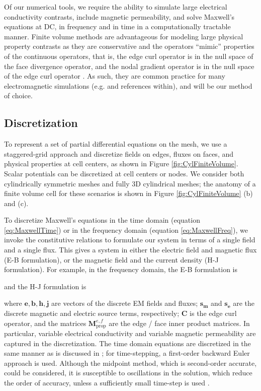 \documentclass[preprint,review,3p,times,onecolumn,authoryear]{elsarticle}
\begin{document}
Of our numerical tools, we require the ability to simulate large electrical conductivity contrasts, include magnetic permeability, and solve Maxwell's equations at DC, in frequency and in time in a computationally tractable manner. Finite volume methods are advantageous for modeling large physical property contrasts as they are conservative and the operators ``mimic'' properties of the continuous operators, that is, the edge curl operator is in the null space of the face divergence operator, and the nodal gradient operator is in the null space of the edge curl operator \citep{Hyman1999}. As such, they are common practice for many electromagnetic simulations (e.g. \cite{Horesh2011, Haber2014, Jahandari2014} and references within), and will be our method of choice.


\subsection{Discretization}

To represent a set of partial differential equations on the mesh, we use a staggered-grid approach \citep{Yee1966} and discretize fields on edges, fluxes on faces, and physical properties at cell centers, as shown in Figure \ref{fig:CylFiniteVolume}. Scalar potentials can be discretized at cell centers or nodes. We consider both cylindrically symmetric meshes and fully 3D cylindrical meshes; the anatomy of a finite volume cell for these scenarios is shown in Figure \ref{fig:CylFiniteVolume} (b) and (c).




To discretize Maxwell's equations in the time domain (equation \ref{eq:MaxwellTime}) or in the frequency domain (equation \ref{eq:MaxwellFreq}), we invoke the constitutive relations to formulate our system in terms of a single field and a single flux. This gives a system in either the electric field and magnetic flux (E-B formulation), or the magnetic field and the current density (H-J formulation). For example, in the frequency domain, the E-B formulation is

and the H-J formulation is

where $\mathbf{e}, \mathbf{b}, \mathbf{h}, \mathbf{j}$ are vectors of the discrete EM fields and fluxes; $\mathbf{s_m}$ and $\mathbf{s_e}$ are the discrete magnetic and electric source terms, respectively; $\mathbf{C}$ is the edge curl operator, and the matrices $\mathbf{M}_{\text{prop}}^{e,f}$ are the edge / face inner product matrices. In particular, variable electrical conductivity and variable magnetic permeability are captured in the discretization. The time domain equations are discretized in the same manner as is discussed in \citep{Heagy2017}; for time-stepping, a first-order backward Euler approach is used. Although the midpoint method, which is second-order accurate, could be considered, it is susceptible to oscillations in the solution, which reduce the order of accuracy, unless a sufficiently small time-step is used \citep{Haber2004, Haber2014}.
\end{document}
